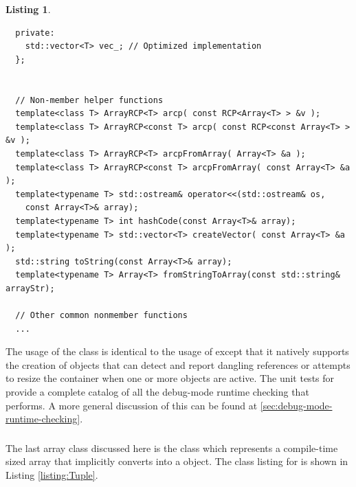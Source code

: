 \documentclass[pdf,ps2pdf,11pt]{SANDreport}
\newtheorem{listing}{Listing}
\begin{document}
\begin{listing}
{\begin{verbatim}
  private:
    std::vector<T> vec_; // Optimized implementation
  };
  
  
  // Non-member helper functions
  template<class T> ArrayRCP<T> arcp( const RCP<Array<T> > &v );
  template<class T> ArrayRCP<const T> arcp( const RCP<const Array<T> > &v );
  template<class T> ArrayRCP<T> arcpFromArray( Array<T> &a );
  template<class T> ArrayRCP<const T> arcpFromArray( const Array<T> &a );
  template<typename T> std::ostream& operator<<(std::ostream& os,
    const Array<T>& array);
  template<typename T> int hashCode(const Array<T>& array);
  template<typename T> std::vector<T> createVector( const Array<T> &a );
  std::string toString(const Array<T>& array);
  template<typename T> Array<T> fromStringToArray(const std::string& arrayStr);

  // Other common nonmember functions
  ...
\end{verbatim}}
\end{listing}

The usage of the {} class is identical to the usage of
{} except that it natively supports the creation
of {} objects that can detect and report dangling
references or attempts to resize the container when one or more
{} objects are active.  The unit tests for
{} provide a complete catalog of all the debug-mode
runtime checking that {} performs.  A more general
discussion of this can be found at
{}\ref{sec:debug-mode-runtime-checking}.


%
{}\subsubsection{}
%

The last array class discussed here is the {} class
which represents a compile-time sized array that implicitly converts
into a {} object.  The class listing for
{} is shown in Listing {}\ref{listing:Tuple}.
\end{document}
